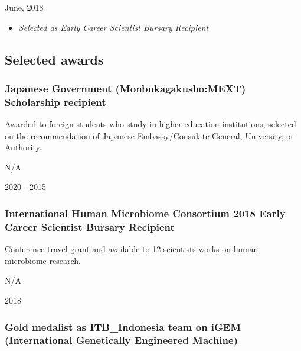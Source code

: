 \documentclass[]{article}
\providecommand{\tightlist}{%
  \setlength{\itemsep}{0pt}\setlength{\parskip}{0pt}}
\begin{document}
June, 2018

\begin{itemize}
\tightlist
\item
  \emph{Selected as Early Career Scientist Bursary Recipient}
\end{itemize}

\hypertarget{selected-awards}{%
\subsection{Selected awards}\label{selected-awards}}

\hypertarget{japanese-government-monbukagakushomext-scholarship-recipient}{%
\subsubsection{\texorpdfstring{\textbf{Japanese Government
(Monbukagakusho:MEXT) Scholarship
recipient}}{Japanese Government (Monbukagakusho:MEXT) Scholarship recipient}}\label{japanese-government-monbukagakushomext-scholarship-recipient}}

Awarded to foreign students who study in higher education institutions,
selected on the recommendation of Japanese Embassy/Consulate General,
University, or Authority.

N/A

2020 - 2015

\hypertarget{international-human-microbiome-consortium-2018-early-career-scientist-bursary-recipient}{%
\subsubsection{\texorpdfstring{\textbf{International Human Microbiome
Consortium 2018 Early Career Scientist Bursary
Recipient}}{International Human Microbiome Consortium 2018 Early Career Scientist Bursary Recipient}}\label{international-human-microbiome-consortium-2018-early-career-scientist-bursary-recipient}}

Conference travel grant and available to 12 scientists works on human
microbiome research.

N/A

2018

\hypertarget{gold-medalist-as-itb_indonesia-team-on-igem-international-genetically-engineered-machine}{%
\subsubsection{\texorpdfstring{\textbf{Gold medalist as ITB\_Indonesia
team on iGEM (International Genetically Engineered
Machine)}}{Gold medalist as ITB\_Indonesia team on iGEM (International Genetically Engineered Machine)}}\label{gold-medalist-as-itb_indonesia-team-on-igem-international-genetically-engineered-machine}}
\end{document}
